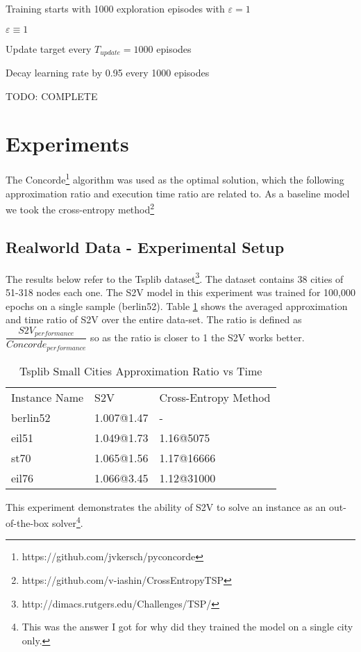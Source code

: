 \documentclass[10pt,a4paper,draft]{article}
\begin{document}
\begin{list}{•}{•}
	\item Training starts with 1000 exploration episodes with $\varepsilon = 1$
	\item $\varepsilon \equiv 1$
	\item Update target every $T_{update} = 1000$ episodes
	\item Decay learning rate by 0.95 every 1000 episodes
\end{list}
TODO: COMPLETE



\section{Experiments}
	The Concorde\footnote{https://github.com/jvkersch/pyconcorde} algorithm was used as the optimal solution, which the following approximation ratio and execution time ratio are related to. As a baseline model we took the cross-entropy method\footnote{https://github.com/v-iashin/CrossEntropyTSP}
\subsection{Realworld Data - Experimental Setup}
	The results below refer to the Tsplib dataset\footnote{http://dimacs.rutgers.edu/Challenges/TSP/}. The dataset contains 38 cities of 51-318 nodes each one.
	The S2V model in this experiment was trained for 100,000 epochs on a single sample (berlin52). 
	Table \ref{tb_tsplib_performance_s2v_vs_ce} shows the averaged approximation and time ratio of S2V over the entire data-set. The ratio is defined as $\dfrac{S2V_{performance}}{Concorde_{performance}} $ so as the ratio is closer to 1 the S2V works better.
	
	\begin{table}[h] \centering
	\begin{tabular}{lll}
	 	Instance Name	& S2V   		& Cross-Entropy Method 	\\
	 	berlin52 		& 1.007@1.47	& - 					\\
		eil51  			& 1.049@1.73	& 1.16@5075				\\
		st70 			& 1.065@1.56 	& 1.17@16666 			\\
		eil76			& 1.066@3.45 	& 1.12@31000
	\end{tabular}
	\caption{Tsplib Small Cities Approximation Ratio vs Time} 
	\label{tb_tsplib_performance_s2v_vs_ce}
	\end{table}
	This experiment demonstrates the ability of S2V to solve an instance as an out-of-the-box solver\footnote{This was the answer I got for why did they trained the model on a single city only.}. 
	
\end{document}
